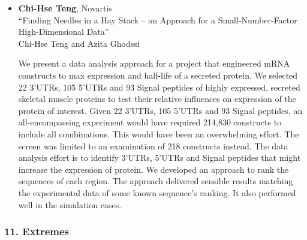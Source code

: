 \begin{itemize}
\item \textbf{Chi-Hse Teng}, Novartis \\
``Finding Needles in a Hay Stack – an Approach for a Small-Number-Factor High-Dimensional Data'' \\
Chi-Hse Teng and Azita Ghodssi


We present a data analysis approach for a project that engineered mRNA constructs to max expression and half-life of a secreted protein.  We selected 22 3’UTRs, 105 5’UTRs and 93 Signal peptides of highly expressed, secreted skeletal muscle proteins to test their relative influences on expression of the protein of interest.  Given 22 3’UTRs, 105 5’UTRs and 93 Signal peptides, an all-encompassing experiment would have required 214,830 constructs to include all combinations. This would have been an overwhelming effort. The screen was limited to an examination of 218 constructs instead.  The data analysis effort is to identify 3’UTRs, 5’UTRs and Signal peptides that might increase the expression of protein.   We developed an approach to rank the sequences of each region.  The approach delivered sensible results matching the experimental data of some known sequence’s ranking.   It also performed well in the simulation cases.

\end{itemize}

\subsubsection*{11. Extremes}

